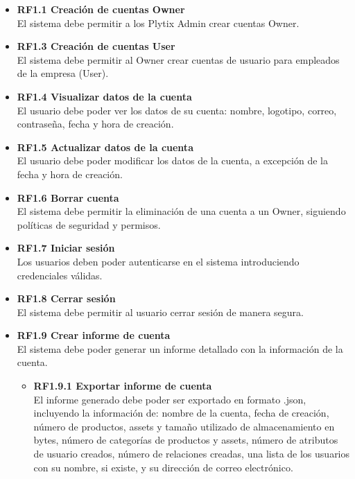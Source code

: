\documentclass[12pt.a4paper]{article}
\begin{document}
\begin{itemize}
    \item \textbf{RF1.1 Creación de cuentas Owner} \\
    El sistema debe permitir a los Plytix Admin crear cuentas Owner.
    
    \item \textbf{RF1.3 Creación de cuentas User} \\
    El sistema debe permitir al Owner crear cuentas de usuario para empleados de la empresa (User).

    \item \textbf{RF1.4 Visualizar datos de la cuenta} \\
    El usuario debe poder ver los datos de su cuenta: nombre, logotipo, correo, contraseña, fecha y hora de creación.

    \item \textbf{RF1.5 Actualizar datos de la cuenta} \\
    El usuario debe poder modificar los datos de la cuenta, a excepción de la fecha y hora de creación.

    \item \textbf{RF1.6 Borrar cuenta} \\
    El sistema debe permitir la eliminación de una cuenta a un Owner, siguiendo políticas de seguridad y permisos.

    \item \textbf{RF1.7 Iniciar sesión} \\
    Los usuarios deben poder autenticarse en el sistema introduciendo credenciales válidas.

    \item \textbf{RF1.8 Cerrar sesión} \\
    El sistema debe permitir al usuario cerrar sesión de manera segura.

    \item \textbf{RF1.9 Crear informe de cuenta} \\
    El sistema debe poder generar un informe detallado con la información de la cuenta.
    \begin{itemize}
        \item \textbf{RF1.9.1 Exportar informe de cuenta} \\
        El informe generado debe poder ser exportado en formato .json, incluyendo la información  de: nombre de la cuenta, fecha de creación, número de productos, assets y tamaño utilizado de almacenamiento en bytes, número de categorías de productos y assets, número de atributos de usuario creados, número de relaciones creadas, una lista de los usuarios con su nombre, si existe, y su dirección de correo electrónico.
    \end{itemize}



\end{itemize}
\end{document}
